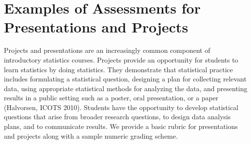 \section{\textbf{Examples of Assessments for Presentations and Projects}}

Projects and presentations are an increasingly 
common component of introductory statistics courses.  
 Projects provide an opportunity for 
students to learn statistics by doing statistics.  They demonstrate that statistical practice includes
formulating a statistical question, designing a plan for collecting relevant data, using appropriate
statistical methods for analyzing the data, and presenting results in a public setting such as a poster,
oral presentation, or a paper (Halvorsen, ICOTS 2010). 
Students have the opportunity to 
develop statistical questions that arise from broader research questions, to design data
analysis plans, and to communicate results.
We provide a basic rubric for presentations and projects along with a sample numeric grading scheme.

